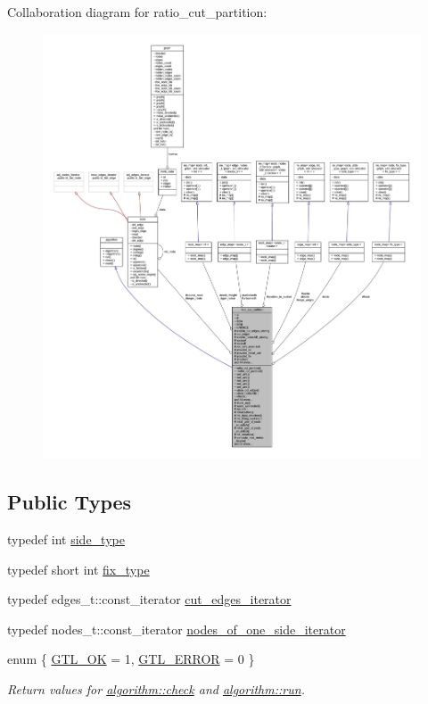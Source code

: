 Collaboration diagram for ratio\+\_\+cut\+\_\+partition\+:\nopagebreak
\begin{figure}[H]
\begin{center}
\leavevmode
\includegraphics[width=350pt]{classratio__cut__partition__coll__graph}
\end{center}
\end{figure}
\subsection*{Public Types}
\begin{DoxyCompactItemize}
\item 
typedef int \mbox{\hyperlink{classratio__cut__partition_ace53442bd0c1e21fbf00858ec6f6b456}{side\+\_\+type}}
\item 
typedef short int \mbox{\hyperlink{classratio__cut__partition_a558dda40abda8ab03edb4605dbb81e36}{fix\+\_\+type}}
\item 
typedef edges\+\_\+t\+::const\+\_\+iterator \mbox{\hyperlink{classratio__cut__partition_a910bb0e5c927ffd26a3805787e179194}{cut\+\_\+edges\+\_\+iterator}}
\item 
typedef nodes\+\_\+t\+::const\+\_\+iterator \mbox{\hyperlink{classratio__cut__partition_af438a591f6559b479bf40e9ac9cfcf0e}{nodes\+\_\+of\+\_\+one\+\_\+side\+\_\+iterator}}
\item 
enum \{ \mbox{\hyperlink{classalgorithm_af1a0078e153aa99c24f9bdf0d97f6710a5114c20e4a96a76b5de9f28bf15e282b}{G\+T\+L\+\_\+\+OK}} = 1, 
\mbox{\hyperlink{classalgorithm_af1a0078e153aa99c24f9bdf0d97f6710a6fcf574690bbd6cf710837a169510dd7}{G\+T\+L\+\_\+\+E\+R\+R\+OR}} = 0
 \}
\begin{DoxyCompactList}\small\item\em Return values for \mbox{\hyperlink{classalgorithm_a76361fb03ad1cf643affc51821e43bed}{algorithm\+::check}} and \mbox{\hyperlink{classalgorithm_a734b189509a8d6b56b65f8ff772d43ca}{algorithm\+::run}}. \end{DoxyCompactList}\end{DoxyCompactItemize}
